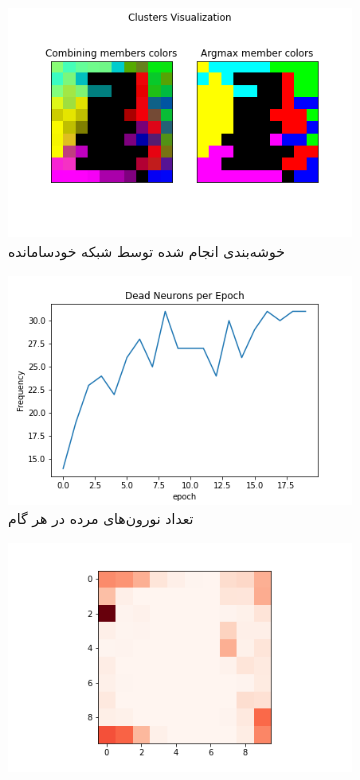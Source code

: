 \documentclass[12pt, a4paper]{article}
\begin{document}
\clearpage

\begin{figure}[h]
    \begin{subfigure}{\linewidth}
        \centering
        \includegraphics[width=0.8\linewidth]{images/q5/r14/cluster.png}
        \caption{خوشه‌بندی انجام شده توسط شبکه خودسامانده}
    \end{subfigure}
    \newline
    \begin{subfigure}{0.45\linewidth}
        \includegraphics[width=\linewidth]{images/q5/r14/dead.png}
        \caption{تعداد نورون‌های مرده در هر گام}
    \end{subfigure}
    \hfill
    \begin{subfigure}{0.45\linewidth}
        \includegraphics[width=\linewidth]{images/q5/r14/umatrix.png}

\end{subfigure}
\end{figure}
\end{document}
